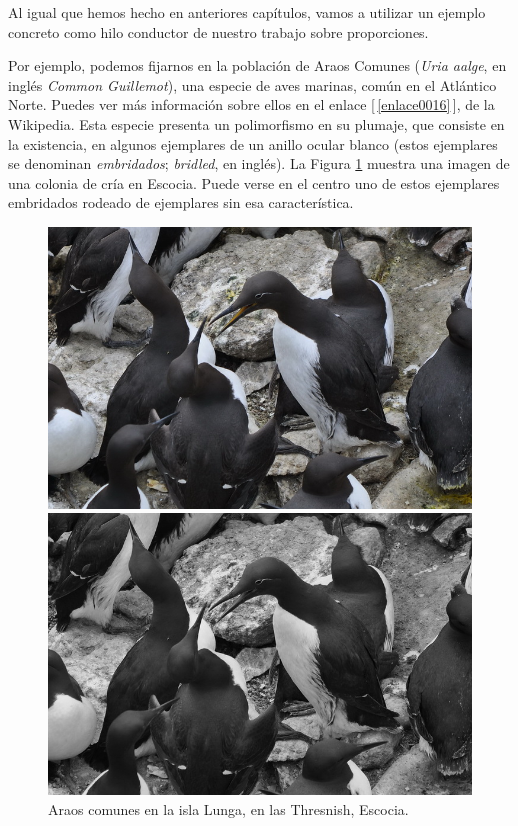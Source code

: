 Al igual que hemos hecho en anteriores capítulos, vamos a utilizar un ejemplo concreto como hilo
conductor de nuestro trabajo sobre proporciones.
\begin{ejemplo}\label{cap08:ejem:Araos}

Por ejemplo, podemos fijarnos en la población de Araos Comunes ({\em Uria aalge}, en inglés {\em Common
Guillemot}), una especie de aves marinas, común en el Atlántico Norte. Puedes ver más información
sobre ellos en el enlace [\,\ref{enlace0016}\,]\label{enlace0016a}, de la  Wikipedia. Esta especie presenta un polimorfismo en su plumaje, que consiste en la existencia, en algunos ejemplares de un anillo ocular blanco (estos ejemplares se denominan {\em embridados}; {\em bridled}, en inglés). La Figura \ref{cap07:fig:Araos} muestra una imagen de una colonia de cría en Escocia. Puede verse en el centro uno de estos ejemplares embridados rodeado de ejemplares sin esa característica.

\begin{figure}[htbp]
\begin{center}
\begin{enColor}
\includegraphics[width=13cm]{../fig/Cap08-araos.png}
\end{enColor}
\begin{bn}
\includegraphics[width=13cm]{../fig/Cap08-araos-bn.png}
\end{bn}
\caption{Araos comunes en la isla Lunga, en las Thresnish, Escocia.}
\label{cap07:fig:Araos}
\end{center}
\end{figure}


\end{ejemplo}

